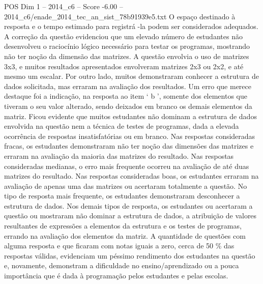 \begin{textsample}{POS Dim 1 – 2014\_c6 – Score -6.00 – 2014\_c6/enade\_2014\_tec\_an\_sist\_78b91939e5.txt}
O espaço destinado à resposta e o tempo estimado para registrá -la podem ser considerados adequados.
A correção da questão evidenciou que um elevado número de estudantes não desenvolveu o raciocínio lógico necessário para testar os programas, mostrando não ter noção da dimensão das matrizes.
A questão envolvia o uso de matrizes 3x3, e muitos resultados apresentados envolveram matrizes 2x3 ou 2x2, e até mesmo um escalar.
Por outro lado, muitos demonstraram conhecer a estrutura de dados solicitada, mas erraram na avaliação dos resultados.
Um erro que merece destaque foi a indicação, na resposta ao item ‘ b ’, somente dos elementos que tiveram o seu valor alterado, sendo deixados em branco os demais elementos da matriz.
Ficou evidente que muitos estudantes não dominam a estrutura de dados envolvida na questão nem a técnica de testes de programas, dada a elevada ocorrência de respostas insatisfatórias ou em branco.
Nas respostas consideradas fracas, os estudantes demonstraram não ter noção das dimensões das matrizes e erraram na avaliação da maioria das matrizes do resultado.
Nas respostas consideradas medianas, o erro mais frequente ocorreu na avaliação de até duas matrizes do resultado.
Nas respostas consideradas boas, os estudantes erraram na avaliação de apenas uma das matrizes ou acertaram totalmente a questão.
No tipo de resposta mais frequente, os estudantes demonstraram desconhecer a estrutura de dados.
Nos demais tipos de resposta, os estudantes ou acertaram a questão ou mostraram não dominar a estrutura de dados, a atribuição de valores resultantes de expressões a elementos da estrutura e os testes de programas, errando na avaliação dos elementos da matriz.
A quantidade de questões com alguma resposta e que ficaram com notas iguais a zero, cerca de 50 \% das respostas válidas, evidenciam um péssimo rendimento dos estudantes na questão e, novamente, demonstram a dificuldade no ensino/aprendizado ou a pouca importância que é dada à programação pelos estudantes e pelas escolas.

\end{textsample}
